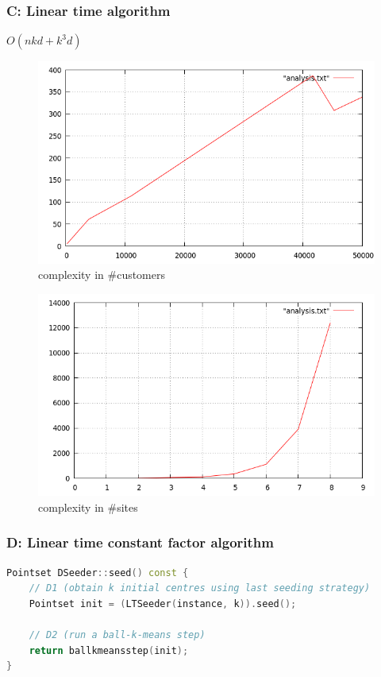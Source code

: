 \documentclass{beamer}
\begin{document}
\begin{frame}[fragile]
\frametitle{C: Linear time algorithm}
$O(nkd +k^3d)$
\begin{figure}[ht]
	\centering
	\includegraphics[scale=0.2]{LTSeeder_complexity_in_n.png}
	\caption{complexity in \#customers}
\end{figure}
\begin{figure}[ht]
	\centering
	\includegraphics[scale=0.2]{LTSeeder_complexity_in_k.png}
	\caption{complexity in \#sites}
\end{figure}
\end{frame}

  
      \begin{frame}[fragile]

    \frametitle{D: Linear time constant factor algorithm}
\begin{lstlisting}[language=C++]
Pointset DSeeder::seed() const {
    // D1 (obtain k initial centres using last seeding strategy)
	Pointset init = (LTSeeder(instance, k)).seed();

	// D2 (run a ball-k-means step)
	return ballkmeansstep(init);
}
\end{lstlisting}
\end{frame}
\end{document}
